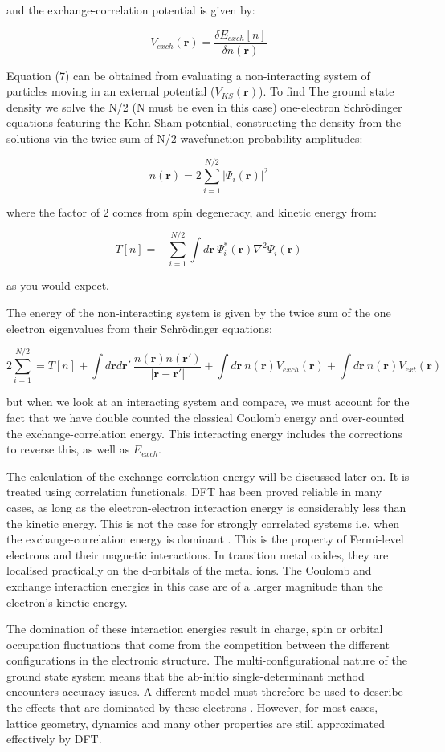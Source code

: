 \documentclass[10pt]{article}
\begin{document}
and the exchange-correlation potential is given by:

$$V_{exch}(\mathbf{r}) = \frac{\delta E_{exch}[n]}{\delta n(\mathbf{r})}$$

Equation (7) can be obtained from evaluating a non-interacting system of particles moving in an external potential ($V_{KS}(\mathbf{r})$). To find The ground state density we solve the N/2 (N must be even in this case) one-electron Schrödinger equations featuring the Kohn-Sham potential, constructing the density from the solutions via the twice sum of N/2 wavefunction probability amplitudes:

$$n(\mathbf{r}) = 2\sum_{i=1}^{N/2}|\Psi_i(\mathbf{r})|^2$$

where the factor of 2 comes from spin degeneracy, and kinetic energy from:

$$T[n] = -\sum_{i=1}^{N/2}\int d\mathbf{r} \ \Psi_i^*(\mathbf{r})\nabla^2\Psi_i(\mathbf{r})$$

as you would expect.

The energy of the non-interacting system is given by the twice sum of the one electron eigenvalues from their Schrödinger equations:

$$2\sum_{i=1}^{N/2} = T[n]+\int d\mathbf{r}d\mathbf{r}' \ \frac{n(\mathbf{r})n(\mathbf{r}')}{|\mathbf{r}-\mathbf{r}'|} +\int d\mathbf{r} \ n(\mathbf{r})V_{exch}(\mathbf{r}) + \int d\mathbf{r} \ n(\mathbf{r})V_{ext}(\mathbf{r})$$

but when we look at an interacting system and compare, we must account for the fact that we have double counted the classical Coulomb energy and over-counted the exchange-correlation energy. This interacting energy includes the corrections to reverse this, as well as $E_{exch}$.

The calculation of the exchange-correlation energy will be discussed later on. It is treated using correlation functionals. DFT has been proved reliable in many cases, as long as the electron-electron interaction energy is considerably less than the kinetic energy. This is not the case for strongly correlated systems i.e. when the exchange-correlation energy is dominant \cite{pickett1989electronic}. This is the property of Fermi-level electrons and their magnetic interactions. In transition metal oxides, they are localised practically on the d-orbitals of the metal ions. The Coulomb and exchange interaction energies in this case are of a larger magnitude than the electron's kinetic energy.

The domination of these interaction energies result in charge, spin or orbital occupation fluctuations that come from the competition between the different configurations in the electronic structure. The multi-configurational nature of the ground state system means that the ab-initio single-determinant method encounters accuracy issues. A different model must therefore be used to describe the effects that are dominated by these electrons \cite{gelle2009accurate}. However, for most cases, lattice geometry, dynamics and many other properties are still approximated effectively by DFT.
\end{document}
